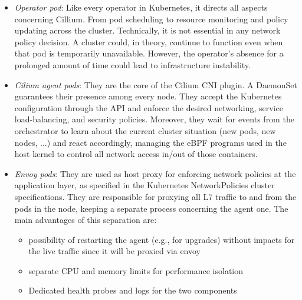 \begin{itemize}
  \item \textit{Operator pod}: Like every operator in Kubernetes, it directs all
    aspects concerning Cillium. From pod scheduling to resource monitoring and
    policy updating across the cluster. Technically, it is not essential in any
    network policy decision. A cluster could, in theory, continue to function even
    when that pod is temporarily unavailable. However, the operator's absence for a
    prolonged amount of time could lead to infrastructure instability.
  \item \textit{Cilium agent pods}: They are the core of the Cilium CNI plugin.
    A DaemonSet guarantees their presence among every node. They accept the
    Kubernetes configuration through the API and enforce the desired networking,
    service load-balancing, and security policies. Moreover, they wait for events
    from the orchestrator to learn about the current cluster situation (new pods,
    new nodes, ...) and react accordingly, managing the eBPF programs used in the
    host kernel to control all network access in/out of those containers.
  \item \textit{Envoy pods}: They are used as host proxy for enforcing network
    policies at the application layer, as specified in the Kubernetes
    NetworkPolicies cluster specifications. They are responsible for proxying all L7
    traffic to and from the pods in the node, keeping a separate process concerning
    the agent one.  The main advantages of this separation are:
    \begin{itemize}
      \item possibility of restarting the agent (e.g., for upgrades) without impacts for the live traffic since it will be proxied via envoy
      \item separate CPU and memory limits for performance isolation
      \item Dedicated health probes and logs for the two components
    \end{itemize}
\end{itemize}


